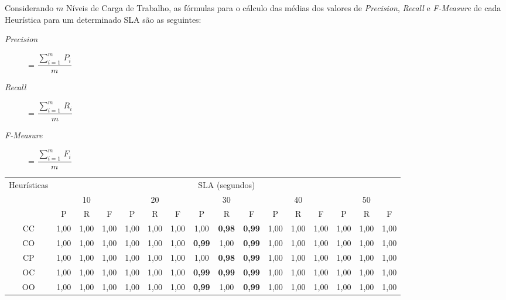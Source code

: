 Considerando $m$ Níveis de Carga de Trabalho, as fórmulas para o cálculo das médias dos valores de \emph{Precision}, \emph{Recall} e \emph{F-Measure} de cada Heurística para um determinado SLA são as seguintes: 

\begin{description}
  \item[\normalfont\emph{Precision}] = $\dfrac{\sum\limits_{i=1}^{m}\,P_{i}}{m}$
  \item[\normalfont\emph{Recall}] = $\dfrac{\sum\limits_{i=1}^{m}\,R_{i}}{m}$
  \item[\normalfont\emph{F-Measure}] = $\dfrac{\sum\limits_{i=1}^{m}\,F_{i}}{m}$
\end{description}


\begin{table}[t]
  \centering
    {\fontsize{2.4mm}{1em}\selectfont
    \begin{tabular}{|c|c|c|c|c|c|c|c|c|c|c|c|c|c|c|c|}
    \hline
    \multirow{3}{*}{Heurísticas} & \multicolumn{15}{c|}{SLA (segundos)} \\
    \cline{2-16}
          & \multicolumn{3}{c|}{10} & \multicolumn{3}{c|}{20} & \multicolumn{3}{c|}{30} & \multicolumn{3}{c|}{40} & \multicolumn{3}{c|}{50} \\
          \cline{2-16}
          & P     & R     & F     & P     & R     & F     & P     & R     & F     & P     & R     & F     & P     & R     & F \\
          \hline          
    CC    & 1,00  & 1,00  & 1,00  & 1,00  & 1,00  & 1,00  & 1,00  & \textbf{\color{red}0,98}  & \textbf{\color{red}0,99}  & 1,00  & 1,00  & 1,00  & 1,00  & 1,00  & 1,00 \\
    CO    & 1,00  & 1,00  & 1,00  & 1,00  & 1,00  & 1,00  & \textbf{\color{red}0,99}  & 1,00  & \textbf{\color{red}0,99}  & 1,00  & 1,00  & 1,00  & 1,00  & 1,00  & 1,00 \\
    CP    & 1,00  & 1,00  & 1,00  & 1,00  & 1,00  & 1,00  & 1,00  & \textbf{\color{red}0,98}  & \textbf{\color{red}0,99}  & 1,00  & 1,00  & 1,00  & 1,00  & 1,00  & 1,00 \\
    OC    & 1,00  & 1,00  & 1,00  & 1,00  & 1,00  & 1,00  & \textbf{\color{red}0,99}  & \textbf{\color{red}0,99}  & \textbf{\color{red}0,99}  & 1,00  & 1,00  & 1,00  & 1,00  & 1,00  & 1,00 \\
    OO    & 1,00  & 1,00  & 1,00  & 1,00  & 1,00  & 1,00  & \textbf{\color{red}0,99}  & 1,00  & \textbf{\color{red}0,99}  & 1,00  & 1,00  & 1,00  & 1,00  & 1,00  & 1,00 \\

\end{tabular}}
\end{table}
